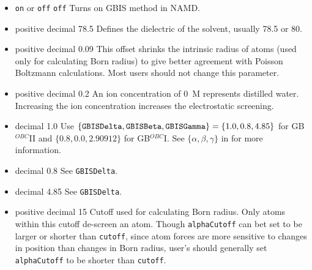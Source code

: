 \begin{itemize}

\item
{} {{\tt on} or {\tt off}} {{\tt off}} {Turns on GBIS method in NAMD. }

\item
{} {positive decimal} {78.5} {Defines the dielectric of the solvent, usually 78.5 or 80.}

\item
{} {positive decimal} {0.09} {This offset shrinks the intrinsic radius of atoms (used only for calculating Born radius) to give better agreement with Poisson Boltzmann calculations. Most users should not change this parameter.}

\item
{} {positive decimal} {0.2} {An ion concentration of 0~M represents distilled water. Increasing the ion concentration increases the electrostatic screening.}

\item
{} {decimal} {1.0} {Use $\{{\tt GBISDelta}, {\tt GBISBeta},{\tt GBISGamma}\} = \{1.0, 0.8, 4.85\}$ for GB$^{OBC}$II and $\{0.8, 0.0, 2.90912\}$ for GB$^{OBC}$I. See $\{\alpha, \beta, \gamma\}$ in \cite{ONUF04} for more information.}

\item
{} {decimal} {0.8} {See {\tt GBISDelta}.}

\item
{} {decimal} {4.85} {See {\tt GBISDelta}.}

\item
{} {positive decimal} {15} {Cutoff used for calculating Born radius. Only atoms within this cutoff de-screen an atom. Though {\tt alphaCutoff} can bet set to be larger or shorter than {\tt cutoff}, since atom forces are more sensitive to changes in position than changes in Born radius, user's should generally set {\tt alphaCutoff} to be shorter than {\tt cutoff}.}


\end{itemize}
